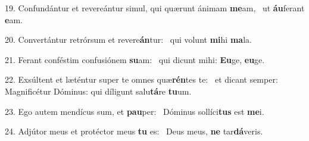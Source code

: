 19. Confundántur et revereántur simul, qui quærunt ánimam \textbf{me}am, \ast\  ut \textbf{áu}ferant \textbf{e}am.\

20. Convertántur retrórsum et revere\textbf{án}tur: \ast\  qui volunt \textbf{mi}hi \textbf{ma}la.\

21. Ferant conféstim confusiónem \textbf{su}am: \ast\  qui dicunt mihi: \textbf{Eu}ge, \textbf{eu}ge.\

22. Exsúltent et læténtur super te omnes quæ\textbf{rén}tes te: \ast\  et dicant semper: Magnificétur Dóminus: qui díligunt salu\textbf{tá}re \textbf{tu}um.\

23. Ego autem mendícus sum, et \textbf{pau}per: \ast\  Dóminus sollíci\textbf{tus} est \textbf{me}i.\

24. Adjútor meus et protéctor meus \textbf{tu} es: \ast\  Deus meus, \textbf{ne} tar\textbf{dá}veris.\

